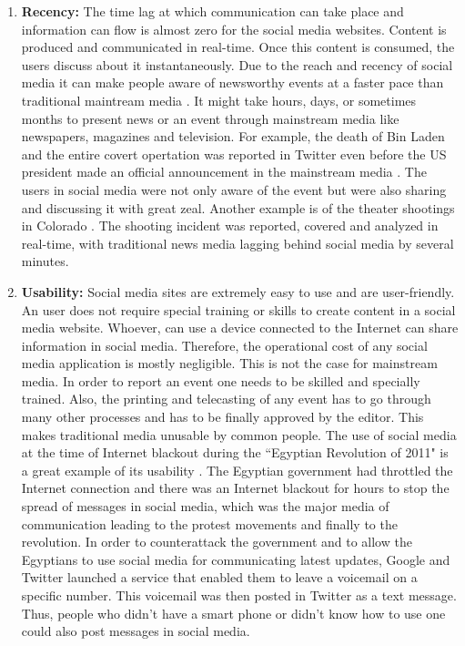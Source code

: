 \begin{enumerate}
\item \textbf{Recency:} The time lag at which communication can take place and information can flow is almost zero for the social media websites. Content is produced and communicated in real-time. Once this content is consumed, the users discuss about it instantaneously. Due to the reach and recency of social media it can make people aware of newsworthy events at a faster pace than traditional maintream media \cite{phelan2009using,petrovic2013can}. It might take hours, days, or sometimes months to present news or an event through mainstream media like newspapers, magazines and television. For example, the death of Bin Laden and the entire covert opertation was reported in Twitter even before the US president made an official announcement in the mainstream media \cite{ladendeathnews}. The users in social media were not only aware of the event but were also sharing and discussing it with great zeal.  Another example is of the theater shootings in Colorado \cite{coloradoshooting}. The shooting incident was reported, covered and analyzed in real-time, with traditional news media lagging behind social media by several minutes.

\item \textbf{Usability:} Social media sites are extremely easy to use and are user-friendly. An user does not require special training or skills to create content in a social media website. Whoever, can use a device connected to the Internet can share information in social media. Therefore, the operational cost of any social media application is mostly negligible. This is not the case for mainstream media. In order to report an event one needs to be skilled and specially trained. Also, the printing and telecasting of any event has to go through many other processes and has to be finally approved by the editor. This makes traditional media unusable by common people. The use of social media at the time of Internet blackout during the ``Egyptian Revolution of 2011" is a great example of its usability \cite{egyptianrevinternetblackout}. The Egyptian government had throttled the Internet connection and there was an Internet blackout for hours to stop the spread of messages in social media, which was the major media of communication leading to the protest movements and finally to the revolution. In order to counterattack the government and to allow the Egyptians to use social media for communicating latest updates, Google and Twitter launched a service that enabled them to leave a voicemail on a specific number. This voicemail was then posted in Twitter as a text message. Thus, people who didn't have a smart phone or didn't know how to use one could also post messages in social media.


\end{enumerate}

